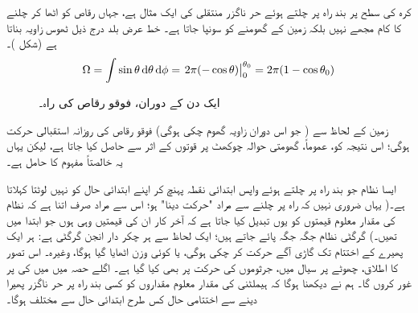  کرہ کی سطح پر  بند راہ پر چلتے ہوئے حر ناگزر منتقلی کی ایک مثال     ہے،  جہاں  رقاص  کو اٹھا کر چلنے کا کام مجھے نہیں  بلکہ زمین کے گھومنے کو  سونپا جاتا ہے۔  خط عرض بلد  درج ذیل ٹھوس زاویہ بناتا ہے  (شکل   )۔ 
\begin{align}
\Omega = \int \sin \theta \dif \theta \dif \phi =\left.  2\pi (- \cos \theta)\right\vert_0^{\theta_0} = 2 \pi (1 - \cos \theta_0)
\end{align}
%
\begin{figure}
\centering
{}
\caption{ایک دن کے دوران، فوقو رقاص کی راہ۔}
\label{شکل_حرارت_نا_گزر_فوقو_رقاص_ایک_دن}
\end{figure}



زمین کے لحاظ سے ( جو اس دوران  زاویہ گھوم چکی  ہوگی)  فوقو    رقاص   کی روزانہ استقبالی حرکت   ہوگی؛ اس نتیجہ کو، عموماً،   گھومتی حوالہ چوکھٹ پر    قوتوں کے اثر  سے حاصل کیا جاتا ہے، لیکن یہاں یہ خالصتاً    مفہوم کا حامل ہے۔ 

 ایسا نظام جو بند راہ پر چلتے ہوئے   واپس ابتدائی  نقطہ  پہنچ کر اپنے  ابتدائی حال کو  نہیں لوٹتا    کہلاتا ہے۔(  یہاں ضروری نہیں کہ  راہ پر چلنے سے مراد "حرکت دینا"  ہو؛  اس سے مراد صرف اتنا ہے کہ نظام کی مقدار معلوم قیمتوں کو یوں تبدیل کیا جاتا ہے کہ آخر کار ان کی قیمتیں وہی ہوں جو ابتدا میں تھیں۔)   گرگٹی  نظام  جگہ جگہ پائے جاتے ہیں؛  ایک لحاظ سے ہر چکر دار انجن  گرگٹی  ہے:  ہر ایک پھیرے  کے اختتام تک گاڑی آگے حرکت کر چکی ہوگی،  یا کوئی وزن اٹھایا گیا ہوگا،  وغیرہ۔ اس تصور کا اطلاق،    چھوٹے    پر  سیال میں،  جرثوموں کی حرکت پر بھی کیا گیا ہے۔     اگلے حصہ میں میں     کی   پر غور کروں گا۔ ہم نے دیکھنا ہوگا کہ ہیملٹنی کی  مقدار معلوم مقداروں کو کسی بند راہ پر حر ناگزر پھیرا دینے سے اختتامی حال کس طرح ابتدائی حال سے مختلف ہوگا۔ 


